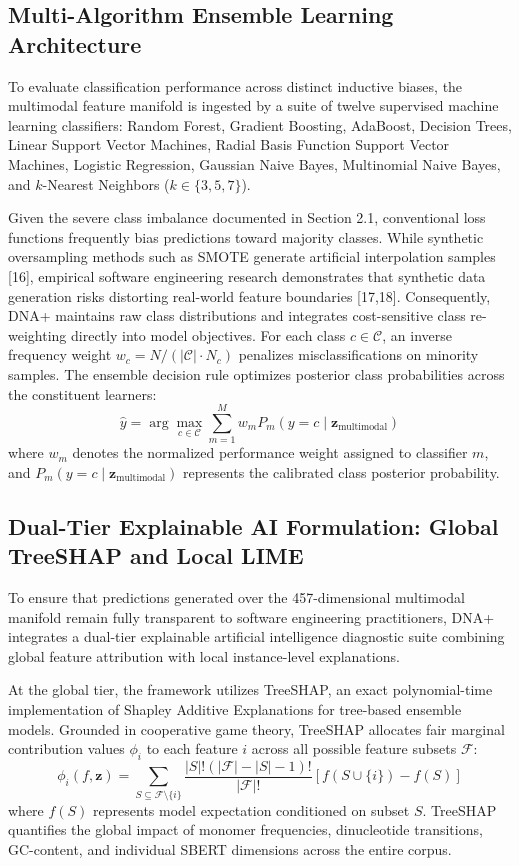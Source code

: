 \subsection{Multi-Algorithm Ensemble Learning Architecture}
To evaluate classification performance across distinct inductive biases, the multimodal feature manifold is ingested by a suite of twelve supervised machine learning classifiers: Random Forest, Gradient Boosting, AdaBoost, Decision Trees, Linear Support Vector Machines, Radial Basis Function Support Vector Machines, Logistic Regression, Gaussian Naive Bayes, Multinomial Naive Bayes, and $k$-Nearest Neighbors ($k \in \{3, 5, 7\}$).

Given the severe class imbalance documented in Section 2.1, conventional loss functions frequently bias predictions toward majority classes. While synthetic oversampling methods such as SMOTE generate artificial interpolation samples [16], empirical software engineering research demonstrates that synthetic data generation risks distorting real-world feature boundaries [17,18]. Consequently, DNA+ maintains raw class distributions and integrates cost-sensitive class re-weighting directly into model objectives. For each class $c \in \mathcal{C}$, an inverse frequency weight $w_c = N / (|\mathcal{C}| \cdot N_c)$ penalizes misclassifications on minority samples. The ensemble decision rule optimizes posterior class probabilities across the constituent learners:
\begin{equation}
\hat{y} = \arg\max_{c \in \mathcal{C}} \sum_{m=1}^{M} w_m P_m(y = c \mid \mathbf{z}_{\text{multimodal}})
\end{equation}
where $w_m$ denotes the normalized performance weight assigned to classifier $m$, and $P_m(y = c \mid \mathbf{z}_{\text{multimodal}})$ represents the calibrated class posterior probability.

\subsection{Dual-Tier Explainable AI Formulation: Global TreeSHAP and Local LIME}
To ensure that predictions generated over the 457-dimensional multimodal manifold remain fully transparent to software engineering practitioners, DNA+ integrates a dual-tier explainable artificial intelligence diagnostic suite combining global feature attribution with local instance-level explanations.

At the global tier, the framework utilizes TreeSHAP, an exact polynomial-time implementation of Shapley Additive Explanations for tree-based ensemble models. Grounded in cooperative game theory, TreeSHAP allocates fair marginal contribution values $\phi_i$ to each feature $i$ across all possible feature subsets $\mathcal{F}$:
\begin{equation}
\phi_i(f, \mathbf{z}) = \sum_{S \subseteq \mathcal{F} \setminus \{i\}} \frac{|S|!(|\mathcal{F}| - |S| - 1)!}{|\mathcal{F}|!} \left[ f(S \cup \{i\}) - f(S) \right]
\end{equation}
where $f(S)$ represents model expectation conditioned on subset $S$. TreeSHAP quantifies the global impact of monomer frequencies, dinucleotide transitions, GC-content, and individual SBERT dimensions across the entire corpus.

